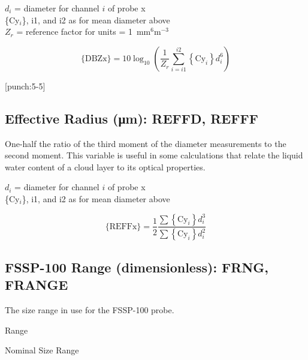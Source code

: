 \documentclass[
  english,
]{book}
\begin{document}
\(d_{i}\) = diameter for channel \(i\) of probe x\\
\{Cy\(_{i}\)\}, i1, and i2 as for mean diameter above\\
\(Z_{r}\) = reference factor for units = 1~mm\(^{6}\)m\(^{-3}\)

\begin{equation}
\mathrm{\{DBZx\}}=10\log_{10}\left({\textstyle \frac{1}{Z_{r}}\sum_{i=i1}^{i2}}{\displaystyle {\displaystyle \left\{ \mathrm{Cy}_{i}\right\} d_{i}^{6}}}\right)
\label{eq:DBZbox}
\end{equation}

\protect\hypertarget{punch:5-5}{}{{[}punch:5-5{]}}

\hypertarget{effective-radius}{%
\subsection*{\texorpdfstring{Effective Radius ({μ}m): REFFD, REFFF}{Effective Radius (μm): REFFD, REFFF}}\label{effective-radius}}

One-half the ratio of the third moment of the diameter measurements to the second moment. This variable is useful in some calculations that relate the liquid water content of a cloud layer to its optical properties.

\(d_{i}\) = diameter for channel \(i\) of probe x\\
\{Cy\(_{i}\)\}, i1, and i2 as for mean diameter above

\begin{equation}
\mathrm{\{REFFx\}}=\frac{1}{2}\frac{\sum{\displaystyle {\displaystyle \left\{ \mathrm{Cy}_{i}\right\} d_{i}^{3}}}}{\sum{\displaystyle {\displaystyle \left\{ \mathrm{Cy}_{i}\right\} d_{i}^{2}}}}
\label{eq:REFFbox}
\end{equation}

\hypertarget{fssp-range}{%
\subsection*{FSSP-100 Range (dimensionless): FRNG, FRANGE}\label{fssp-range}}

The size range in use for the FSSP-100 probe.

Range

Nominal Size Range
\end{document}
